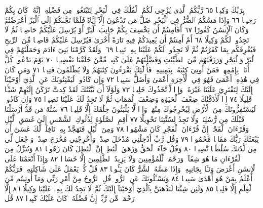 بِرَبِّكَ وَكِيلࣰا ٦٥ رَّبُّكُمُ ٱلَّذِي يُزْجِي لَكُمُ ٱلْفُلْكَ فِي
ٱلْبَحْرِ لِتَبْتَغُوا۟ مِن فَضْلِهِۦٓۚ إِنَّهُۥ كَانَ بِكُمْ رَحِيمࣰا ٦٦
وَإِذَا مَسَّكُمُ ٱلضُّرُّ فِي ٱلْبَحْرِ ضَلَّ مَن تَدْعُونَ إِلَّآ إِيَّاهُۖ فَلَمَّا
نَجَّىٰكُمْ إِلَى ٱلْبَرِّ أَعْرَضْتُمْۚ وَكَانَ ٱلْإِنسَٰنُ كَفُورًا ٦٧ أَفَأَمِنتُمْ
أَن يَخْسِفَ بِكُمْ جَانِبَ ٱلْبَرِّ أَوْ يُرْسِلَ عَلَيْكُمْ حَاصِبࣰا ثُمَّ
لَا تَجِدُوا۟ لَكُمْ وَكِيلًا ٦٨ أَمْ أَمِنتُمْ أَن يُعِيدَكُمْ فِيهِ تَارَةً
أُخْرَىٰ فَيُرْسِلَ عَلَيْكُمْ قَاصِفࣰا مِّنَ ٱلرِّيحِ فَيُغْرِقَكُم بِمَا كَفَرْتُمْ
ثُمَّ لَا تَجِدُوا۟ لَكُمْ عَلَيْنَا بِهِۦ تَبِيعࣰا ٦٩۞ وَلَقَدْ كَرَّمْنَا بَنِيٓ
ءَادَمَ وَحَمَلْنَٰهُمْ فِي ٱلْبَرِّ وَٱلْبَحْرِ وَرَزَقْنَٰهُم مِّنَ ٱلطَّيِّبَٰتِ
وَفَضَّلْنَٰهُمْ عَلَىٰ كَثِيرࣲ مِّمَّنْ خَلَقْنَا تَفْضِيلࣰا ٧٠ يَوْمَ نَدْعُوا۟
كُلَّ أُنَاسِۭ بِإِمَٰمِهِمْۖ فَمَنْ أُوتِيَ كِتَٰبَهُۥ بِيَمِينِهِۦ فَأُو۟لَٰٓئِكَ
يَقْرَءُونَ كِتَٰبَهُمْ وَلَا يُظْلَمُونَ فَتِيلࣰا ٧١ وَمَن كَانَ
فِي هَٰذِهِۦٓ أَعْمَىٰ فَهُوَ فِي ٱلْأٓخِرَةِ أَعْمَىٰ وَأَضَلُّ سَبِيلࣰا ٧٢ وَإِن
كَادُوا۟ لَيَفْتِنُونَكَ عَنِ ٱلَّذِيٓ أَوْحَيْنَآ إِلَيْكَ لِتَفْتَرِيَ
عَلَيْنَا غَيْرَهُۥۖ وَإِذࣰا لَّٱتَّخَذُوكَ خَلِيلࣰا ٧٣ وَلَوْلَآ أَن ثَبَّتْنَٰكَ
لَقَدْ كِدتَّ تَرْكَنُ إِلَيْهِمْ شَيْـࣰٔا قَلِيلًا ٧٤ إِذࣰا لَّأَذَقْنَٰكَ ضِعْفَ
ٱلْحَيَوٰةِ وَضِعْفَ ٱلْمَمَاتِ ثُمَّ لَا تَجِدُ لَكَ عَلَيْنَا نَصِيرࣰا ٧٥
وَإِن كَادُوا۟ لَيَسْتَفِزُّونَكَ مِنَ ٱلْأَرْضِ لِيُخْرِجُوكَ مِنْهَاۖ
وَإِذࣰا لَّا يَلْبَثُونَ خِلَٰفَكَ إِلَّا قَلِيلࣰا ٧٦ سُنَّةَ مَن قَدْ أَرْسَلْنَا
قَبْلَكَ مِن رُّسُلِنَاۖ وَلَا تَجِدُ لِسُنَّتِنَا تَحْوِيلًا ٧٧ أَقِمِ
ٱلصَّلَوٰةَ لِدُلُوكِ ٱلشَّمْسِ إِلَىٰ غَسَقِ ٱلَّيْلِ وَقُرْءَانَ ٱلْفَجْرِۖ
إِنَّ قُرْءَانَ ٱلْفَجْرِ كَانَ مَشْهُودࣰا ٧٨ وَمِنَ ٱلَّيْلِ فَتَهَجَّدْ
بِهِۦ نَافِلَةࣰ لَّكَ عَسَىٰٓ أَن يَبْعَثَكَ رَبُّكَ مَقَامࣰا مَّحْمُودࣰا ٧٩
وَقُل رَّبِّ أَدْخِلْنِي مُدْخَلَ صِدْقࣲ وَأَخْرِجْنِي مُخْرَجَ صِدْقࣲ
وَٱجْعَل لِّي مِن لَّدُنكَ سُلْطَٰنࣰا نَّصِيرࣰا ٨٠ وَقُلْ جَآءَ ٱلْحَقُّ وَزَهَقَ
ٱلْبَٰطِلُۚ إِنَّ ٱلْبَٰطِلَ كَانَ زَهُوقࣰا ٨١ وَنُنَزِّلُ مِنَ ٱلْقُرْءَانِ مَا هُوَ
شِفَآءࣱ وَرَحْمَةࣱ لِّلْمُؤْمِنِينَ وَلَا يَزِيدُ ٱلظَّٰلِمِينَ إِلَّا خَسَارࣰا ٨٢
وَإِذَآ أَنْعَمْنَا عَلَى ٱلْإِنسَٰنِ أَعْرَضَ وَنَـَٔا بِجَانِبِهِۦ وَإِذَا مَسَّهُ
ٱلشَّرُّ كَانَ يَـُٔوسࣰا ٨٣ قُلْ كُلࣱّ يَعْمَلُ عَلَىٰ شَاكِلَتِهِۦ فَرَبُّكُمْ أَعْلَمُ
بِمَنْ هُوَ أَهْدَىٰ سَبِيلࣰا ٨٤ وَيَسْـَٔلُونَكَ عَنِ ٱلرُّوحِۖ قُلِ ٱلرُّوحُ مِنْ
أَمْرِ رَبِّي وَمَآ أُوتِيتُم مِّنَ ٱلْعِلْمِ إِلَّا قَلِيلࣰا ٨٥ وَلَئِن شِئْنَا لَنَذْهَبَنَّ
بِٱلَّذِيٓ أَوْحَيْنَآ إِلَيْكَ ثُمَّ لَا تَجِدُ لَكَ بِهِۦ عَلَيْنَا وَكِيلًا ٨٦
إِلَّا رَحْمَةࣰ مِّن رَّبِّكَۚ إِنَّ فَضْلَهُۥ كَانَ عَلَيْكَ كَبِيرࣰا ٨٧ قُل
